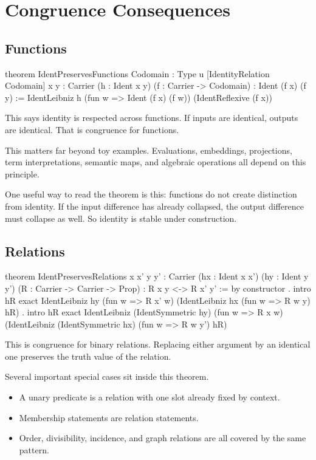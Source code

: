 \documentclass[11pt]{article}
\begin{document}
\section{Congruence Consequences}

\subsection{Functions}

\begin{leanblock}
theorem IdentPreservesFunctions {Codomain : Type u} [IdentityRelation Codomain]
    {x y : Carrier} (h : Ident x y) (f : Carrier -> Codomain) :
    Ident (f x) (f y) :=
  IdentLeibniz h (fun w => Ident (f x) (f w)) (IdentReflexive (f x))
\end{leanblock}

This says identity is respected across functions. If inputs are identical, outputs are identical. That is congruence for functions.

This matters far beyond toy examples. Evaluations, embeddings, projections, term interpretations, semantic maps, and algebraic operations all depend on this principle.

One useful way to read the theorem is this: functions do not create distinction from identity. If the input difference has already collapsed, the output difference must collapse as well. So identity is stable under construction.

\subsection{Relations}

\begin{leanblock}
theorem IdentPreservesRelations {x x' y y' : Carrier}
    (hx : Ident x x') (hy : Ident y y') (R : Carrier -> Carrier -> Prop) :
    R x y <-> R x' y' := by
  constructor
  . intro hR
    exact IdentLeibniz hy (fun w => R x' w)
      (IdentLeibniz hx (fun w => R w y) hR)
  . intro hR
    exact IdentLeibniz (IdentSymmetric hy) (fun w => R x w)
      (IdentLeibniz (IdentSymmetric hx) (fun w => R w y') hR)
\end{leanblock}

This is congruence for binary relations. Replacing either argument by an identical one preserves the truth value of the relation.

Several important special cases sit inside this theorem.

\begin{itemize}[leftmargin=1.5em]
\item A unary predicate is a relation with one slot already fixed by context.
\item Membership statements are relation statements.
\item Order, divisibility, incidence, and graph relations are all covered by the same pattern.
\end{itemize}
\end{document}
